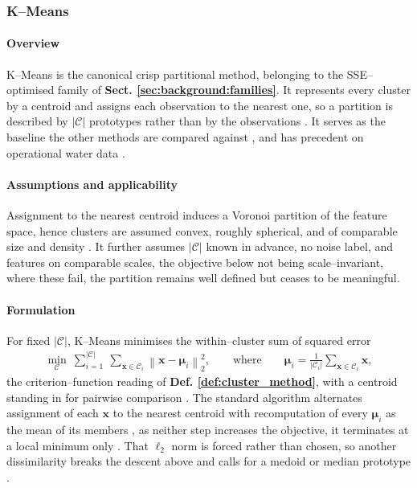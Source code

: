 \subsubsection{K–Means}
\label{sec:tech:kmeans}

\paragraph{Overview}
\label{sec:tech:kmeans:overview}
K–Means is the canonical crisp partitional method, belonging to the SSE–optimised family of \textbf{Sect. \ref{sec:background:families}}.
It represents every cluster by a centroid and assigns each observation to the nearest one, so a partition is described by $|\mathcal C|$ prototypes rather than by the observations \cite{ref_10}. It serves as the baseline the other methods are compared against \cite{ref_1, ref_5}, and has precedent on operational water data \cite{ref_13, ref_17}.

\paragraph{Assumptions and applicability}
\label{sec:tech:kmeans:assumptions}
Assignment to the nearest centroid induces a Voronoi partition of the feature space, hence clusters are assumed convex, roughly spherical, and of comparable size and density \cite{ref_10, ref_11}.
It further assumes $|\mathcal C|$ known in advance, no noise label, and features on comparable scales, the objective below not being scale–invariant, where these fail, the partition remains well defined but ceases to be meaningful.

\paragraph{Formulation}
\label{sec:tech:kmeans:formulation}
For fixed $|\mathcal C|$, K–Means minimises the within–cluster sum of squared error
\begin{align}
    \min_{\mathcal C} ~ \sum_{i = 1}^{|\mathcal C|} ~ \sum_{\mathbf x \in \mathcal C_i} \left\| \mathbf x - \boldsymbol \mu_i \right\|_2^2,
    \qquad \text{where} \qquad
    \boldsymbol \mu_i = \tfrac{1}{|\mathcal C_i|} \sum_{\mathbf x \in \mathcal C_i} \mathbf x,
\end{align}
the criterion–function reading of \textbf{Def. \ref{def:cluster_method}}, with a centroid standing in for pairwise comparison \cite{ref_10}.
The standard algorithm alternates assignment of each $\mathbf x$ to the nearest centroid with recomputation of every $\boldsymbol \mu_i$ as the mean of its members \cite{ref_5, ref_11}, as neither step increases the objective, it terminates at a local minimum only \cite{ref_2, ref_25}.
That $\ell_2$ norm is forced rather than chosen, so another dissimilarity breaks the descent above and calls for a medoid or median prototype \cite{ref_10, ref_11}.

